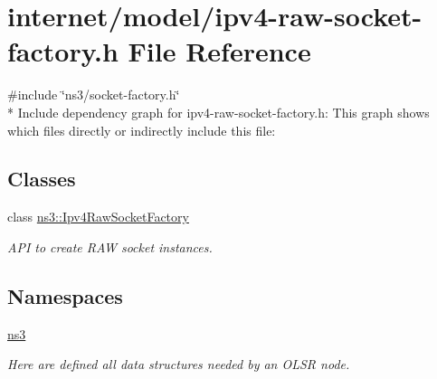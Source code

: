\hypertarget{ipv4-raw-socket-factory_8h}{}\section{internet/model/ipv4-\/raw-\/socket-\/factory.h File Reference}
\label{ipv4-raw-socket-factory_8h}
{\ttfamily \#include \char`\"{}ns3/socket-\/factory.\+h\char`\"{}}\\*
Include dependency graph for ipv4-\/raw-\/socket-\/factory.h\+:
This graph shows which files directly or indirectly include this file\+:
\subsection*{Classes}
\begin{DoxyCompactItemize}
\item 
class \hyperlink{classns3_1_1Ipv4RawSocketFactory}{ns3\+::\+Ipv4\+Raw\+Socket\+Factory}
\begin{DoxyCompactList}\small\item\em A\+PI to create R\+AW socket instances. \end{DoxyCompactList}\end{DoxyCompactItemize}
\subsection*{Namespaces}
\begin{DoxyCompactItemize}
\item 
 \hyperlink{namespacens3}{ns3}
\begin{DoxyCompactList}\small\item\em Here are defined all data structures needed by an O\+L\+SR node. \end{DoxyCompactList}\end{DoxyCompactItemize}
